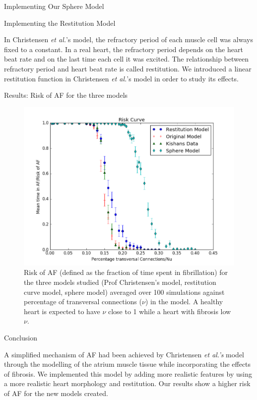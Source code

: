 \documentclass[final,hyperref={pdfpagelabels=false}]{beamer}
\begin{document}
\begin{frame}[t]
\begin{columns}[t]
\begin{column}{.465\textwidth}
\begin{block}{Implementing Our Sphere Model}
\end{block}

\begin{block}{Implementing the Restitution Model}

In Christensen \emph{et al.}'s model, the refractory period of each muscle cell was always fixed to a constant.
In a real heart, the refractory period depends on the heart beat rate and on the last time each cell it was excited. The relationship between refractory period and heart beat rate is called restitution. We introduced a linear restitution function in  Christensen \emph{et al.}'s model in order to study its effects.
\end{block}


\begin{block}{Results: Risk of AF for the three models}

\begin{figure}
\includegraphics[width=0.65\linewidth]{xriskcurvesphere}
\caption{Risk of AF (defined as the fraction of time spent in fibrillation) for the three models studied (Prof Christensen's model, restitution curve model, sphere model) averaged over 100 simulations against percentage of transversal connections ($\nu$) in the model. A healthy heart is expected to have $\nu$ close to 1 while a heart with fibrosis low $\nu$.}
\end{figure}

\end{block}


\begin{block}{Conclusion}

A simplified mechanism of AF had been achieved by Christensen \emph{et al.'s} model through the modelling of the atrium muscle tissue while incorporating the effects of fibrosis. We implemented this model by adding more realistic features by using a more realistic heart morphology and restitution. Our results show a higher risk of AF for the new models created.


\end{block}
\end{column}
\end{columns}
\end{frame}
\end{document}
